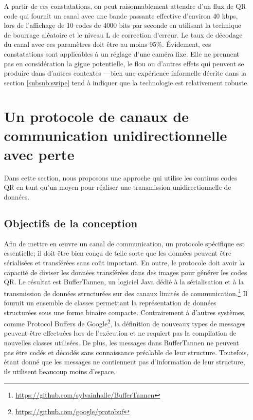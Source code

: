 A partir de ces constatations, on peut raisonnablement attendre d'un flux de QR code qui fournit un canal avec une bande passante effective d'environ 40 kbps, lors de l'affichage de 10 codes de 4000 bits par seconde en utilisant la technique de bourrage aléatoire et le niveau L de correction d'erreur. Le taux de décodage du canal avec ces paramètres doit être au moins 95\%. Évidement, ces constatations sont applicables à un réglage d'une caméra fixe. Elle ne prennent pas en considération la gigue potentielle, le flou ou d'autres effets qui peuvent se produire dans d'autres contextes ---bien une expérience informelle décrite dans la section \ref{subsub:swipe} tend à indiquer que la technologie est relativement robuste.


\section{Un protocole de canaux de communication unidirectionnelle avec perte} %

Dans cette section, nous proposons une approche qui utilise les continus codes QR en tant qu'un moyen pour réaliser une transmission unidirectionnelle de données.

\subsection{Objectifs de la conception}

Afin de mettre en \oe{}uvre un canal de communication, un protocole spécifique est essentielle; il doit être bien conçu de telle sorte que les données peuvent être sérialisées et transférées sans coût important. En outre, le protocole doit avoir la capacité de diviser les données transférées dans des images pour générer les codes QR. Le résultat est BufferTannen, un logiciel Java dédié à la sérialisation et à la transmission de données structurées sur des canaux limités de communication.\footnote{\url{https://github.com/sylvainhalle/BufferTannen}} Il fournit un ensemble de classes permettant la représentation de données structurées sous une forme binaire compacte. Contrairement à d'autres systèmes, comme Protocol Buffers de Google\footnote{\url{https://github.com/google/protobuf}}, la définition de nouveaux types de messages peuvent être effectuées lors de l'exécution et ne requiert pas la compilation de nouvelles classes utilisées. De plus, les messages dans BufferTannen ne peuvent pas être codés et décodés sans connaissance préalable de leur structure. Toutefois, étant donné que les messages ne contiennent pas d'information de leur structure, ils utilisent beaucoup moins d'espace.

